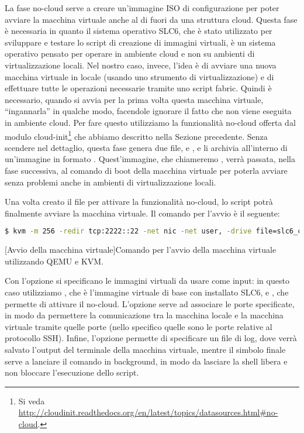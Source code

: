             La fase no-cloud serve a creare un'immagine ISO di configurazione per poter avviare la macchina virtuale anche al di fuori da una struttura cloud. Questa fase è necessaria in quanto il sistema operativo \ac{SLC6}, che è stato utilizzato per sviluppare e testare lo script di creazione di immagini virtuali, è un sistema operativo pensato per operare in ambiente cloud e non su ambienti di virtualizzazione locali. Nel nostro caso, invece, l'idea è di avviare una nuova macchina virtuale in locale (usando uno strumento di virtualizzazione) e di effettuare tutte le operazioni necessarie tramite uno script fabric. Quindi è necessario, quando si avvia per la prima volta questa macchina virtuale, ``ingannarla'' in qualche modo, facendole ignorare il fatto che non viene eseguita in ambiente cloud. Per fare questo utilizziamo la funzionalità no-cloud offerta dal modulo cloud-init\footnote{Si veda \url{http://cloudinit.readthedocs.org/en/latest/topics/datasources.html\#no-cloud}.} che abbiamo descritto nella Sezione precedente. Senza scendere nel dettaglio, questa fase genera due file,  e , e li archivia all'interno di un'immagine in formato . Quest'immagine, che chiameremo , verrà passata, nella fase successiva, al comando di boot della macchina virtuale per poterla avviare senza problemi anche in ambienti di virtualizzazione locali.
            
            Una volta creato il file  per attivare la funzionalità no-cloud, lo script potrà finalmente avviare la macchina virtuale. Il comando per l'avvio è il seguente:
            
            \begin{center}
                \begin{lstlisting}[language=bash, gobble=18]
                    $ kvm -m 256 -redir tcp:2222::22 -net nic -net user, -drive file=slc6_cern_x86_64.qcow2,if=virtio -drive file=init.iso,if=virtio -serial file:qemu-output.log &
                \end{lstlisting}
                \captionsetup{textformat=empty,labelformat=empty} \vspace{-2em}
                [Avvio della macchina virtuale]{Comando per l'avvio della macchina virtuale utilizzando \ac{QEMU} e \ac{KVM}.}
            \end{center}
            
            Con l'opzione  si specificano le immagini virtuali da usare come input: in questo caso utilizziamo , che è l'immagine virtuale di base con installato \ac{SLC6}, e , che permette di attivare il no-cloud. L'opzione  serve ad associare le porte specificate, in modo da permettere la comunicazione tra la macchina locale e la macchina virtuale tramite quelle porte (nello specifico quelle sono le porte relative al protocollo \ac{SSH}). Infine, l'opzione  permette di specificare un file di log, dove verrà salvato l'output del terminale della macchina virtuale, mentre il simbolo \bash{&} finale serve a lanciare il comando in background, in modo da lasciare la shell libera e non bloccare l'esecuzione dello script.
            

